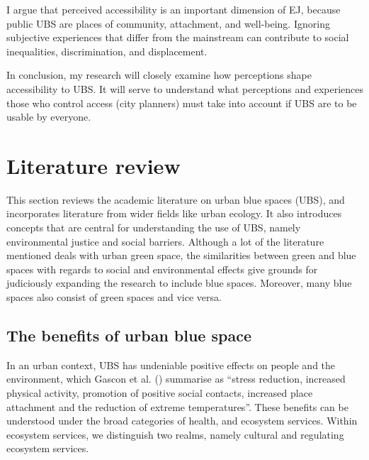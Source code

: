 \documentclass{article}
\begin{document}
I argue that perceived accessibility is an important dimension of EJ, because public UBS are places of community, attachment, and well-being. Ignoring subjective experiences that differ from the mainstream can contribute to social inequalities, discrimination, and displacement.

In conclusion, my research will closely examine how perceptions shape accessibility to UBS. It will serve to understand what perceptions and experiences those who control access (city planners) must take into account if UBS are to be usable by everyone.

\pagebreak
\section{Literature review}

This section reviews the academic literature on urban blue spaces (UBS), and incorporates literature from wider fields like urban ecology. It also introduces concepts that are central for understanding the use of UBS, namely environmental justice and social barriers. Although a lot of the literature mentioned deals with urban green space, the similarities between green and blue spaces with regards to social and environmental effects give grounds for judiciously expanding the research to include blue spaces. Moreover, many blue spaces also consist of green spaces and vice versa.

\subsection{The benefits of urban blue space}

In an urban context, UBS has undeniable positive effects on people and the environment, which Gascon et al. (\citeyear{gascon2017outdoor}) summarise as ``stress reduction, increased physical activity, promotion of positive social contacts, increased place attachment and the reduction of extreme temperatures''. These benefits can be understood under the broad categories of health, and ecosystem services. Within ecosystem services, we distinguish two realms, namely cultural and regulating ecosystem services.
\end{document}
